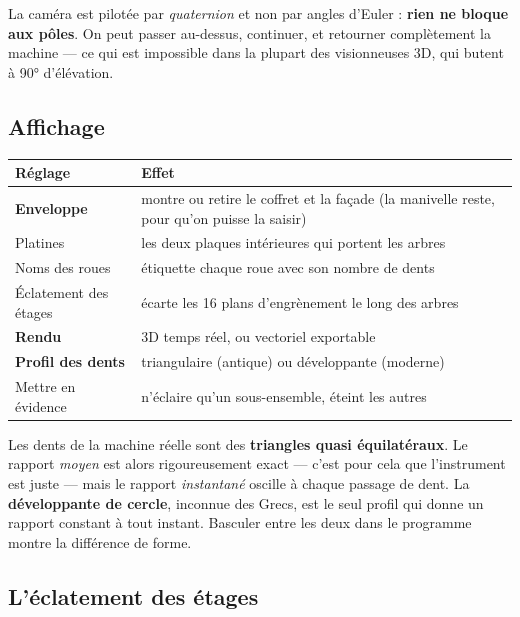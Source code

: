 \documentclass[a4paper,11pt]{article}
\begin{document}
\begin{astuce}
La caméra est pilotée par \emph{quaternion} et non par angles d'Euler :
\textbf{rien ne bloque aux pôles}. On peut passer au-dessus, continuer, et
retourner complètement la machine — ce qui est impossible dans la plupart des
visionneuses 3D, qui butent à 90° d'élévation.
\end{astuce}

\subsection{Affichage}

\begin{center}
\begin{tabularx}{\textwidth}{@{}lX@{}}
\toprule
\rowcolor{lightblue}\textbf{Réglage} & \textbf{Effet} \\
\midrule
\textbf{Enveloppe} & montre ou retire le coffret et la façade (la manivelle
reste, pour qu'on puisse la saisir) \\
Platines & les deux plaques intérieures qui portent les arbres \\
Noms des roues & étiquette chaque roue avec son nombre de dents \\
Éclatement des étages & écarte les 16 plans d'engrènement le long des arbres \\
\textbf{Rendu} & 3D temps réel, ou vectoriel exportable \\
\textbf{Profil des dents} & triangulaire (antique) ou développante (moderne) \\
Mettre en évidence & n'éclaire qu'un sous-ensemble, éteint les autres \\
\bottomrule
\end{tabularx}
\end{center}

\begin{info}
Les dents de la machine réelle sont des \textbf{triangles quasi équilatéraux}.
Le rapport \emph{moyen} est alors rigoureusement exact — c'est pour cela que
l'instrument est juste — mais le rapport \emph{instantané} oscille à chaque
passage de dent. La \textbf{développante de cercle}, inconnue des Grecs, est le
seul profil qui donne un rapport constant à tout instant. Basculer entre les
deux dans le programme montre la différence de forme.
\end{info}

\subsection{L'éclatement des étages}
\end{document}
